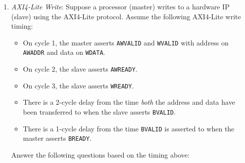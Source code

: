 \documentclass[11pt]{article}
\begin{document}
\begin{enumerate}
\begin{enumerate}[label=(\alph*)]
    \item What is the number of 32-bit words needed to store $x$, $y$ and $h$?
    \item Suppose that the filter coefficients are stored in registers,
    and each 32-bit word write takes 5 clock cycles to write.  How many 
    clock cycles are needed to program the filter coefficients?
    \item Suppose that FIR filter IP can run the filter operation for $N$
    length vectors in $N+K$ clock cycles.  How many clock cycles are needed to
    run the filter for length $N=1000$ vectors and $K=32$ filter coefficients?
    \item If the processing requires programming the filter coefficients,
    then running the filter, what percentage of the total time is spent
    programming the filter coefficients?
\end{enumerate}
\begin{solution}
Enter your solutions here.
\end{solution}


\item {} \emph{AXI4-Lite Write}:  Suppose 
a processor (master) writes to a hardware IP (slave) using the AXI4-Lite protocol.
Assume the following AXI4-Lite write timing:
\begin{itemize} 
\item On cycle 1, the master asserts \texttt{AWVALID} and \texttt{WVALID} 
with address on \texttt{AWADDR} and data on \texttt{WDATA}. 
\item On cycle 2, the slave asserts \texttt{AWREADY}. 
\item On cycle 3, the slave asserts \texttt{WREADY}. 
\item There is a 2-cycle delay from the time \emph{both} the address 
and data have been transferred to when the slave asserts \texttt{BVALID}. 
\item There is a 1-cycle delay from the time \texttt{BVALID} is asserted to 
when the master asserts \texttt{BREADY}. 
\end{itemize}
Answer the following questions based on the timing above:


\end{enumerate}
\end{document}
